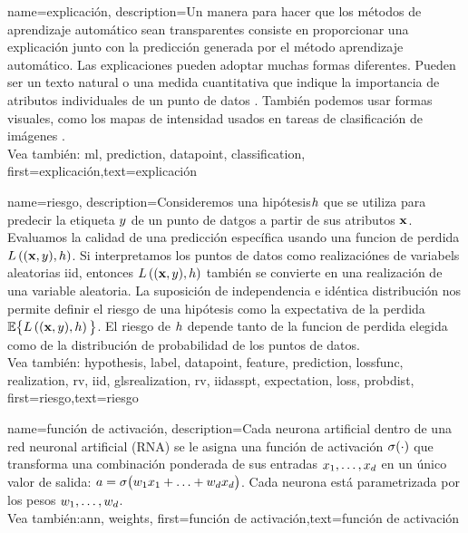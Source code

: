 {name={explicación},
	description={Un manera para hacer que los métodos de aprendizaje automático sean transparentes consiste en  
		proporcionar una explicación junto con la predicción generada por el método 
		aprendizaje automático. Las explicaciones pueden adoptar muchas formas diferentes. Pueden ser un texto natural
		o una medida cuantitativa que indique la importancia de atributos individuales
		de un punto de datos \cite{Molnar2019}.
 		También podemos usar formas visuales, como los mapas de intensidad usados en tareas de clasificación de imágenes \cite{GradCamPaper}.
		 \\
		 Vea también: \gls{ml}, \gls{prediction}, \gls{datapoint},  \gls{classification}},
		first={explicación},text={explicación} 
}

{name={riesgo},
	description={Consideremos una hipótesis$h$ que se utiliza para predecir la etiqueta 
		$y$ de un punto de datgos a partir de sus atributos ${\bf x}$. Evaluamos 
		la calidad de una predicción específica usando una funcion de perdida $L\left(({\bf x},y),h \right)$. 
		Si interpretamos los puntos de datos como realizaciónes de variabels aleatorias iid, 
		entonces $L\left(({\bf x},y),h \right)$ también se convierte en una realización
		de una variable aleatoria. La suposición de independencia e idéntica distribución nos permite definir el riesgo de una hipótesis
		como la expectativa de la perdida $\mathbb{E} \big\{L\left(({\bf x},y),h \right) \big\}$. 
		El riesgo de $h$ depende tanto de la funcion de perdida elegida como de la distribución de probabilidad de los puntos de datos.
		\\
		 Vea también: \gls{hypothesis}, \gls{label}, \gls{datapoint}, \gls{feature},  \gls{prediction}, \gls{lossfunc}, \gls{realization}, \gls{rv}, \gls{iid}, gls{realization}, \gls{rv}, \gls{iidasspt}, \gls{expectation}, \gls{loss}, \gls{probdist}},
	first={riesgo},text={riesgo} 
}

{name={función de activación},
	description={Cada neurona artificial dentro de una red neuronal artificial (RNA) se le asigna 
		una función de activación $\sigma(\cdot)$ que transforma una combinación ponderada de 
		sus entradas $x_{1},\ldots,x_{d}$ en un único valor de salida: 
		$a = \sigma\big(w_{1} x_{1}+\ldots+w_{d} x_{d} \big)$. 
		Cada neurona está parametrizada por los pesos $w_{1},\ldots,w_{d}$.
		\\
		 Vea también:\gls{ann}, \gls{weights}},
first={función de activación},text={función de activación} 
}

